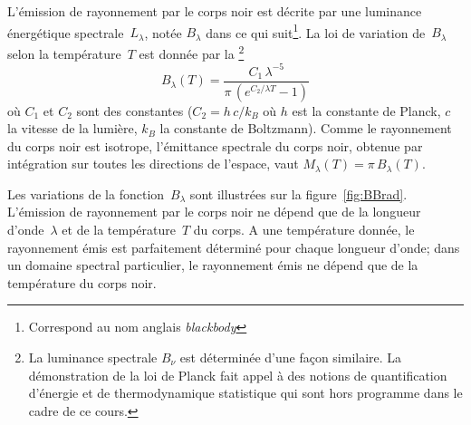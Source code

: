 \sk
L'émission de rayonnement par le corps noir est décrite par une luminance énergétique spectrale~$L_{\lambda}$, notée $B_\lambda$ dans ce qui suit\footnote{Correspond au nom anglais \emph{blackbody}}. La loi de variation de~$B_\lambda$ selon la température~$T$ est donnée par la \footnote{La luminance spectrale $B_\nu$ est déterminée d'une façon similaire. La démonstration de la loi de Planck fait appel à des notions de quantification d'énergie et de thermodynamique statistique qui sont hors programme dans le cadre de ce cours.} $$ B_\lambda(T) = \frac{C_1 \, \lambda^{-5}}{\pi \, \left( e^{ C_2 / \lambda T}-1\right) } $$ où $C_1$ et $C_2$ sont des constantes ($C_2 = h \, c / k_B$ où $h$ est la constante de Planck, $c$ la vitesse de la lumière, $k_B$ la constante de Boltzmann). Comme le rayonnement du corps noir est isotrope, l'émittance spectrale du corps noir, obtenue par intégration sur toutes les directions de l'espace, vaut $ M_\lambda(T) = \pi \, B_\lambda(T) $. 


\sk
Les variations de la fonction~$B_\lambda$ sont illustrées sur la figure~\ref{fig:BBrad}. L'émission de rayonnement par le corps noir ne dépend que de la longueur d'onde~$\lambda$ et de la température~$T$ du corps. A une température donnée, le rayonnement émis est parfaitement déterminé pour chaque longueur d'onde; dans un domaine spectral particulier, le rayonnement émis ne dépend que de la température du corps noir.


